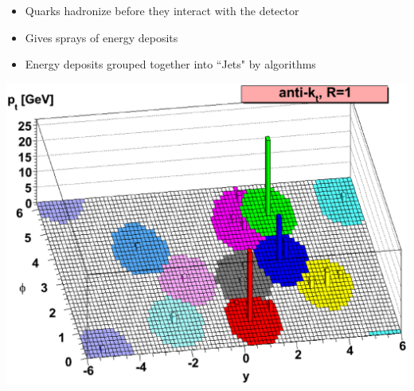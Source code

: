 \documentclass{beamer}
\newcommand*{\header}[1]{\fontsize{16}{8}\selectfont \textbf{{\color{MyPurple}{#1}}}}
\begin{document}
\begin{frame}
\begin{center}
\header{Jets}
\end{center}
\begin{itemize}
\item Quarks hadronize before they interact with the detector
\item Gives sprays of energy deposits
\item Energy deposits grouped together into ``Jets" by algorithms
\end{itemize}
\begin{center}
\includegraphics[height=0.5\textheight]{figures/antikt}
\end{center}
\end{frame}
\end{document}

